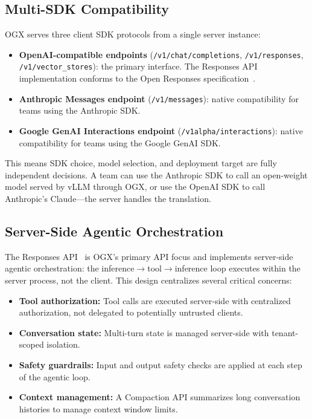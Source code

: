 \documentclass[11pt]{article}
\begin{document}
\subsection{Multi-SDK Compatibility}

OGX serves three client SDK protocols from a single server instance:
\begin{itemize}[nosep]
  \item \textbf{OpenAI-compatible endpoints} (\texttt{/v1/chat/completions}, \texttt{/v1/responses}, \texttt{/v1/vector\_stores}): the primary interface. The Responses API implementation conforms to the Open Responses specification~\cite{openresponses}.
  \item \textbf{Anthropic Messages endpoint} (\texttt{/v1/messages}): native compatibility for teams using the Anthropic SDK.
  \item \textbf{Google GenAI Interactions endpoint} (\texttt{/v1alpha/interactions}): native compatibility for teams using the Google GenAI SDK.
\end{itemize}

This means SDK choice, model selection, and deployment target are fully independent decisions. A team can use the Anthropic SDK to call an open-weight model served by vLLM through OGX, or use the OpenAI SDK to call Anthropic's Claude---the server handles the translation.

\subsection{Server-Side Agentic Orchestration}

The Responses API~\cite{openaiResponsesAPI} is OGX's primary API focus and implements server-side agentic orchestration: the inference$\rightarrow$tool$\rightarrow$inference loop executes within the server process, not the client. This design centralizes several critical concerns:

\begin{itemize}[nosep]
  \item \textbf{Tool authorization:} Tool calls are executed server-side with centralized authorization, not delegated to potentially untrusted clients.
  \item \textbf{Conversation state:} Multi-turn state is managed server-side with tenant-scoped isolation.
  \item \textbf{Safety guardrails:} Input and output safety checks are applied at each step of the agentic loop.
  \item \textbf{Context management:} A Compaction API summarizes long conversation histories to manage context window limits.
\end{itemize}
\end{document}
